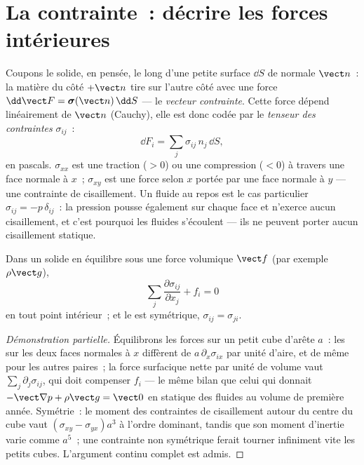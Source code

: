 \section{La contrainte~: décrire les forces intérieures}

\begin{definition}\label{def:b3:continuum-elasticity:stress}
Coupons le solide, en pensée, le long d'une petite surface $\dd S$ de
normale $\vect n$~: la matière du côté $+\vect n$ tire sur l'autre côté
avec une force $\dd\vect F = \boldsymbol\sigma(\vect n)\,\dd S$ --- le
\emph{vecteur contrainte}. Cette force dépend linéairement de $\vect n$
(Cauchy), elle est donc codée par le \emph{tenseur des contraintes}
$\sigma_{ij}$~:
\[
\dd F_i = \sum_j \sigma_{ij}\,n_j\,\dd S ,
\]
en pascals. $\sigma_{xx}$ est une traction ($> 0$) ou une compression
($< 0$) à travers une face normale à $x$~; $\sigma_{xy}$ est une force
selon $x$ portée par une face normale à $y$ --- une contrainte de
cisaillement. Un fluide au repos est le cas particulier
$\sigma_{ij} = -p\,\delta_{ij}$~: la pression pousse également sur
chaque face et n'exerce aucun cisaillement, et c'est pourquoi les
fluides s'écoulent --- ils ne peuvent porter aucun cisaillement
statique.
\end{definition}

\begin{proposition}\label{prop:b3:continuum-elasticity:equilibrium}
Dans un solide en équilibre sous une force volumique $\vect f$ (par
exemple $\rho\vect g$),
\[
\sum_j\frac{\partial\sigma_{ij}}{\partial x_j} + f_i = 0
\]
en tout point intérieur~; et le  est symétrique,
$\sigma_{ij} = \sigma_{ji}$.
\end{proposition}

\begin{proof}[Démonstration partielle]
Équilibrons les forces sur un petit cube d'arête $a$~: les  sur les deux faces normales à $x$ diffèrent de
$a\,\partial_x\sigma_{ix}$ par unité d'aire, et de même pour les autres
paires~; la force surfacique nette par unité de volume vaut
$\sum_j\partial_j\sigma_{ij}$, qui doit compenser $f_i$ --- le même
bilan que celui qui donnait $-\vect\nabla p + \rho\vect g = \vect 0$
en statique des fluides au volume de première année. Symétrie~: le moment des
contraintes de cisaillement autour du centre du cube vaut $(\sigma_{xy} -
\sigma_{yx})a^3$ à l'ordre dominant, tandis que son moment d'inertie
varie comme $a^5$~; une contrainte non symétrique ferait tourner
infiniment vite les petits cubes. L'argument continu complet est admis.
\end{proof}

